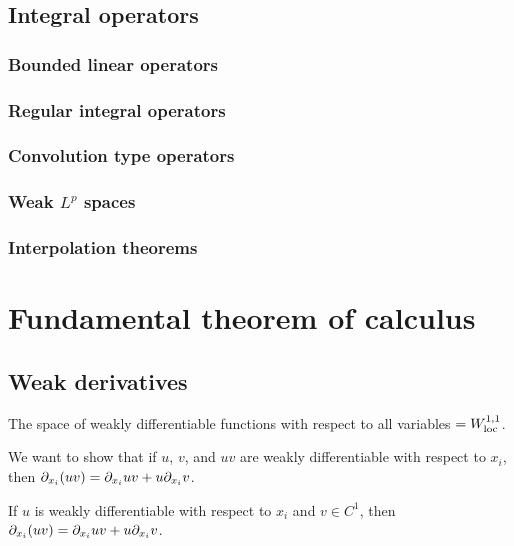 \documentclass{../note}
\begin{document}
\chapter{}



\chapter{Integral operators}
\section{Bounded linear operators}
\section{Regular integral operators}
\section{Convolution type operators}
\section{Weak $L^p$ spaces}
\section{Interpolation theorems}

\part{Fundamental theorem of calculus}

\chapter{Weak derivatives}

The space of weakly differentiable functions with respect to all variables $=W_{\mathrm{loc}}^{1,1}$.

\begin{prb}
We want to show that if $u$, $v$, and $uv$ are weakly differentiable with respect to $x_i$, then $\pd_{x_i}(uv)=\pd_{x_i}uv+u\pd_{x_i}v$.
\begin{parts}
\item If $u$ is weakly differentiable with respect to $x_i$ and $v\in C^1$, then $\pd_{x_i}(uv)=\pd_{x_i}uv+u\pd_{x_i}v$.
\end{parts}
\end{prb}
\end{document}

